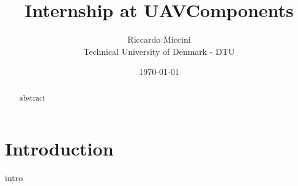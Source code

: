 \documentclass[12pt, a4paper, oneside, twocolumn, final]{article}
\title{Internship at UAVComponents}
\author{Riccardo Miccini  \\
	Technical University of Denmark - DTU \\
	}
\date{\today}
\begin{document}
\begin{titlepage}
\maketitle
\end{titlepage}


\begin{abstract}
abstract 
\end{abstract}

\tableofcontents

\section{Introduction}
intro
\end{document}
